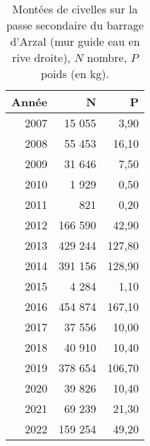 \begin{table}[htbp]
\centering
\begin{tabular}{rrr}
  \hline
Année & N & P \\ 
  \hline
2007 & 15 055 & 3,90 \\ 
  2008 & 55 453 & 16,10 \\ 
  2009 & 31 646 & 7,50 \\ 
  2010 & 1 929 & 0,50 \\ 
  2011 & 821 & 0,20 \\ 
  2012 & 166 590 & 42,90 \\ 
  2013 & 429 244 & 127,80 \\ 
  2014 & 391 156 & 128,90 \\ 
  2015 & 4 284 & 1,10 \\ 
  2016 & 454 874 & 167,10 \\ 
  2017 & 37 556 & 10,00 \\ 
  2018 & 40 910 & 10,40 \\ 
  2019 & 378 654 & 106,70 \\ 
  2020 & 39 826 & 10,40 \\ 
  2021 & 69 239 & 21,30 \\ 
  2022 & 159 254 & 49,20 \\ 
   \hline
\end{tabular}
\caption{Montées de civelles sur la passe secondaire du barrage d'Arzal (mur guide eau en rive droite), $N$ nombre,
				$P$ poids (en kg).} 
\label{table_civelle_12}
\end{table}
